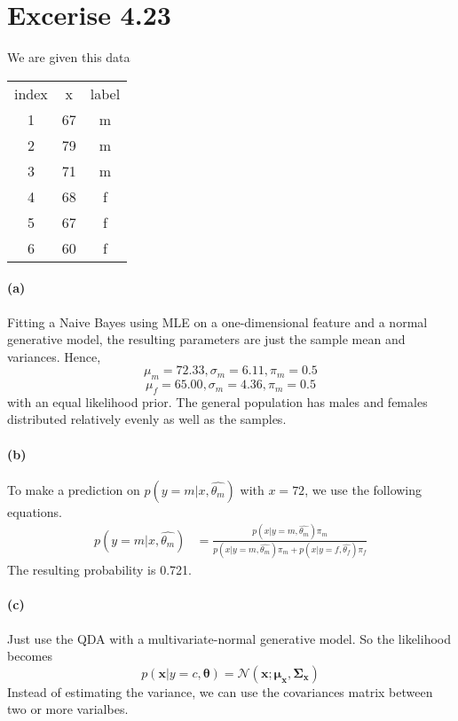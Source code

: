 \documentclass[12pt, letterpaper]{article}
\begin{document}
\section{Excerise 4.23}
We are given this data
\begin{center}
\begin{tabular}{ccc}
index & x  & label \\
1     & 67 & m     \\
2     & 79 & m     \\
3     & 71 & m     \\
4     & 68 & f     \\
5     & 67 & f     \\
6     & 60 & f    
\end{tabular}
\end{center}

\paragraph{(a)} Fitting a Naive Bayes using MLE on a one-dimensional feature and a normal generative model,
the resulting parameters are just the sample mean and variances. Hence,
\[
    \mu_m = 72.33, \sigma_m = 6.11, \pi_m = 0.5
\]
\[
    \mu_f = 65.00, \sigma_m = 4.36, \pi_m = 0.5
\]
with an equal likelihood prior. The general population has males and females distributed relatively evenly
as well as the samples.

\paragraph{(b)} To make a prediction on $p(y=m|x, \hat{\theta_m})$ with $x = 72$, we use the following equations.
\begin{align*}
    p(y=m|x, \hat{\theta_m}) &= \frac{p(x|y=m, \hat{\theta_m})\pi_m}{p(x|y=m, \hat{\theta_m})\pi_m + p(x|y=f, \hat{\theta_f})\pi_f}
\end{align*}
The resulting probability is 0.721.

\paragraph{(c)} Just use the QDA with a multivariate-normal generative model. So the likelihood becomes
\[
    p(\mathbf{x}|y=c, \mathbf{\theta}) = \mathcal{N}(\mathbf{x; \mu_x}, \mathbf{\Sigma_x})
\]
Instead of estimating the variance, we can use the covariances matrix between two or more varialbes.
\end{document}
